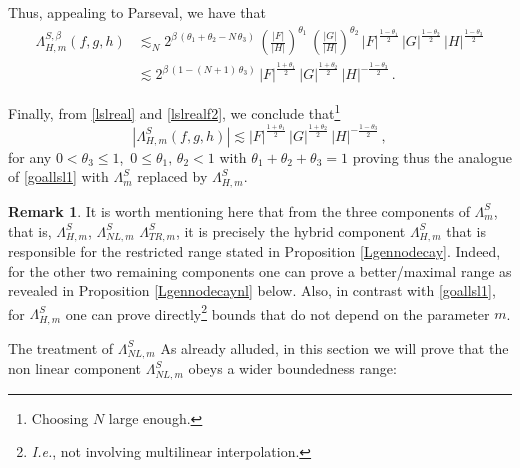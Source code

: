 \documentclass[a4paper,reqno]{amsart}
\makeatletter
\def\subsubsection{\@startsection{subsubsection}{3}%
	\z@{.5\linespacing\@plus.7\linespacing}{-.5em}%
	{\normalfont\bfseries\boldmath}}
\numberwithin{equation}{section}
\theoremstyle{definition}
\newtheorem{remark}[theorem]{Remark}
\def\b{\beta}
\def\L{\Lambda}
\makeatother
\begin{document}
Thus, appealing to Parseval, we have that
\begin{align}
	\L^{S,\b}_{H,m}(f,g,h)&\lesssim_{N} 2^{\b\,(\theta_1+\theta_2-N\,\theta_3)}\,\left(\frac{|F|}{|H|}\right)^{\theta_1}\,\left(\frac{|G|}{|H|}\right)^{\theta_2}\,
	|F|^{\frac{1-\theta_1}{2}}\,|G|^{\frac{1-\theta_2}{2}}\,|H|^{\frac{1-\theta_3}{2}}\nonumber\\[1ex]
	&\lesssim 2^{\b\,(1-(N+1)\,\theta_3)}\,
	|F|^{\frac{1+\theta_1}{2}}\,|G|^{\frac{1+\theta_2}{2}}\,|H|^{-\frac{1-\theta_3}{2}}\,.\label{lslrealf2}
\end{align}

Finally, from \eqref{lslreal} and \eqref{lslrealf2}, we conclude that\footnote{Choosing $N$ large enough.}
\begin{equation}\label{lslconcl}
|\L^{S}_{H,m}(f,g,h)|\lesssim |F|^{\frac{1+\theta_1}{2}}\,|G|^{\frac{1+\theta_2}{2}}\,|H|^{-\frac{1-\theta_3}{2}}\,,
\end{equation}
for any $0<\theta_3\leq 1$,\, $0\leq\theta_1,\,\theta_2<1$ with $\theta_1+\theta_2+\theta_3=1$ proving thus the analogue of \eqref{goallsl1} with $\L^{S}_{m}$ replaced by $\L^{S}_{H,m}$.

\begin{remark}\label{Shybrid} It is worth mentioning here that from the three components of $\L^{S}_{m}$, that is, $\L^{S}_{H,m}$, $\L^{S}_{NL,m}$ $\L^{S}_{TR,m}$, it is precisely the hybrid component $\L^{S}_{H,m}$ that is responsible for the restricted range stated in Proposition \ref{Lgennodecay}. Indeed, for the other two remaining components one can prove a better/maximal range as revealed in Proposition \ref{Lgennodecaynl} below. Also, in contrast with \eqref{goallsl1}, for $\L^{S}_{H,m}$ one can prove directly\footnote{\textit{I.e.}, not involving multilinear interpolation.} bounds that do not depend on the parameter $m$.
\end{remark}

\subsubsection{The treatment of $\L^{S}_{NL,m}$}\label{LGCNLfull} As already alluded, in this section we will prove that the non linear component $\L^{S}_{NL,m}$ obeys a wider boundedness range:
\end{document}
